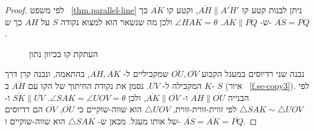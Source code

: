 \begin{proof}
לפי משפט%
~\ref{thm.parallel-line}
ניתן לבנות קטע קו
$\overline{AH}\|\overline{A'H'}$,
וקטע קו
$\overline{AK}$
כך ש-%
$\overline{AK}\|\overline{PQ}$.
$\angle HAK=\theta$
ולכן מה שנשאר הוא למצוא נקודה
$S$
על
$\overline{AH}$
כך ש-%
$\overline{AS}=\overline{PQ}$.
\begin{figure}[tb]
\begin{center}
\end{center}
\caption{העתקת קו בכיוון נתון}\label{f.se-copy1}
\end{figure}
נבנה שני רדיוסים במעגל הקבוע 
$\overline{OU},\overline{OV}$
שמקביליים ל-%
$\overline{AH},\overline{AK}$,
בהתאמה, ונבנה קרן דרך
$K$
המקבילה ל-%
$\overline{UV}$.
נסמן את נקודת החיתוך של הקו עם
$\overline{AH}$
ב-%
$S$
(איור%
~\ref{f.se-copy3}).
לפי הבנייה
$\overline{AH}\|\overline{OU}$
ו-%
$\overline{AK}\|\overline{OV}$,
ולכן
$\angle SAK=\angle UOV=\theta$.
$\overline{SK}\|\overline{UV}$
ו-%
$\triangle SAK\sim \triangle UOV$
לפי זווית-זווית-זווית,
$\triangle UOV$
הוא שווה-שוקיים כי
$\overline{OU}$, $\overline{OV}$
הם רדיוסים של אותו מעגל. מכאן ש-%
$\triangle SAK$
הוא שווה-שוקיים ו-%
$\overline{AS}=\overline{AK}=\overline{PQ}$.
\end{proof}


